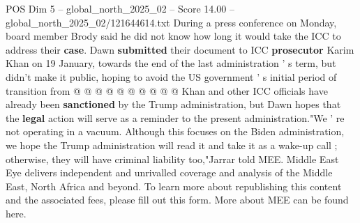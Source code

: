 \begin{textsample}{POS Dim 5 – global\_north\_2025\_02 – Score 14.00 – global\_north\_2025\_02/121644614.txt}
During a press conference on Monday, board member Brody said he did not know how long it would take the ICC to address their \textbf{case}.
Dawn \textbf{submitted} their document to ICC \textbf{prosecutor} Karim Khan on 19 January, towards the end of the last administration ' s term, but didn't make it public, hoping to avoid the US government ' s initial period of transition from @ @ @ @ @ @ @ @ @ @ Khan and other ICC officials have already been \textbf{sanctioned} by the Trump administration, but Dawn hopes that the \textbf{legal} action will serve as a reminder to the present administration."We ' re not operating in a vacuum.
Although this focuses on the Biden administration, we hope the Trump administration will read it and take it as a wake-up call ; otherwise, they will have criminal liability too,"Jarrar told MEE.
Middle East Eye delivers independent and unrivalled coverage and analysis of the Middle East, North Africa and beyond.
To learn more about republishing this content and the associated fees, please fill out this form.
More about MEE can be found here.

\end{textsample}
